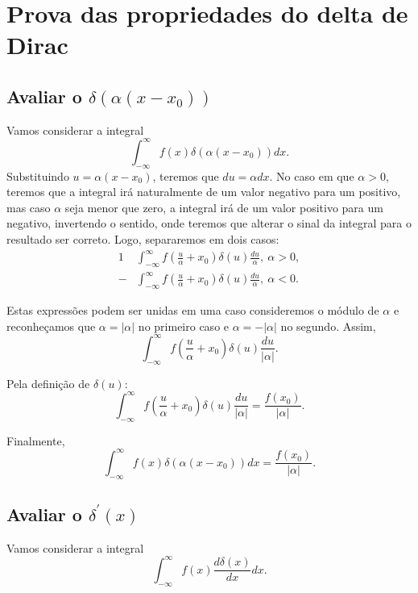 \documentclass{article}
\begin{document}
\section{Prova das propriedades do delta de Dirac}
\subsection{Avaliar o $\delta(\alpha (x-x_0))$}
Vamos considerar a integral
\begin{equation}
 \int_{-\infty}^{\infty} f(x)\delta(\alpha (x-x_0)) dx.
\end{equation}
Substituindo $u = \alpha (x-x_0)$, teremos que $du = \alpha dx$. No caso em que $\alpha > 0$, teremos que a integral irá naturalmente de um valor negativo para um
positivo, mas caso $\alpha$ seja menor que zero, a integral irá de um valor positivo para um negativo, invertendo o sentido, onde teremos que alterar o sinal da integral
para o resultado ser correto. Logo, separaremos em dois casos:
\begin{alignat}{1}
 &\int_{-\infty}^{\infty} f\left(\frac{u}{\alpha} + x_0\right)\delta(u) \frac{du}{\alpha},\ \alpha > 0,\\
 -&\int_{-\infty}^{\infty} f\left(\frac{u}{\alpha} + x_0\right)\delta(u) \frac{du}{\alpha},\ \alpha < 0.
\end{alignat}

Estas expressões podem ser unidas em uma caso consideremos o módulo de $\alpha$ e reconheçamos que $\alpha = |\alpha|$ no primeiro caso e $\alpha = -|\alpha|$ no
segundo. Assim,
\begin{equation}
 \int_{-\infty}^{\infty} f\left(\frac{u}{\alpha} + x_0\right)\delta(u) \frac{du}{|\alpha|}.
\end{equation}

Pela definição de $\delta{(u)}$:
\begin{equation}\label{eq:fxzerosobrealfa}
 \int_{-\infty}^{\infty} f\left(\frac{u}{\alpha} + x_0\right)\delta(u) \frac{du}{|\alpha|} = \frac{f(x_0)}{|\alpha|}.
\end{equation}

Finalmente,
\begin{equation}\label{eq:deltadealfa}
 \int_{-\infty}^{\infty} f(x)\delta(\alpha (x-x_0)) dx = \frac{f(x_0)}{|\alpha|}.
\end{equation}

\subsection{Avaliar o $\delta^{\prime}(x)$}
Vamos considerar a integral
\begin{equation}
 \int_{-\infty}^{\infty} f(x)\frac{d\delta(x)}{dx} dx.
\end{equation}
\end{document}
